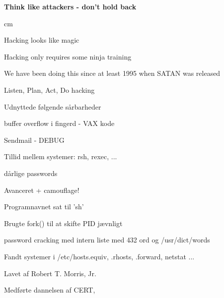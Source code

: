 \documentclass[Screen16to9,17pt]{foils}
\begin{document}
{\bf Think like attackers - don't hold back}



 cm

{\Large Hacking looks like magic}




\begin{list2}
\item Hacking only requires some ninja training
\item We have been doing this since at least 1995 when SATAN was released
\item Listen, Plan, Act, Do hacking
\end{list2}


\begin{list1}
\item Udnyttede følgende sårbarheder
\begin{list2}
\item buffer overflow i fingerd - VAX kode
\item  Sendmail - DEBUG
\item Tillid mellem systemer: rsh, rexec, ...
\item dårlige passwords
\end{list2}
\item Avanceret + camouflage!
\begin{list2}
\item Programnavnet sat til 'sh'
\item Brugte fork() til at skifte PID jævnligt
\item password cracking med intern liste med 432 ord og /usr/dict/words
\item Fandt systemer i /etc/hosts.equiv, .rhosts, .forward, netstat ...
\end{list2}
\item Lavet af Robert T. Morris, Jr.
\item Medførte dannelsen af CERT, 
\end{list1}




\end{document}
